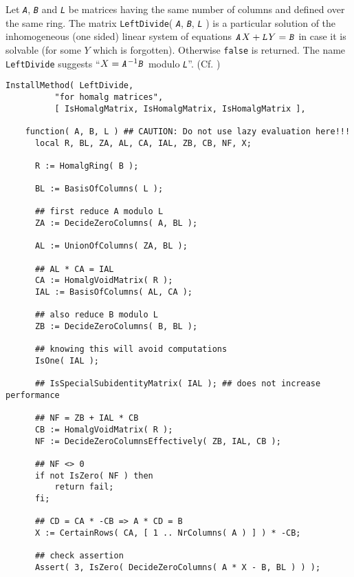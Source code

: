 \documentclass[a4paper,11pt]{report}
\begin{document}
{{{ Let \mbox{\texttt{\slshape A}}, \mbox{\texttt{\slshape B}} and \mbox{\texttt{\slshape L}} be matrices having the same number of columns and defined over the same ring.
The matrix \texttt{LeftDivide}( \mbox{\texttt{\slshape A}}, \mbox{\texttt{\slshape B}}, \mbox{\texttt{\slshape L}} ) is a particular solution of the inhomogeneous (one sided) linear system of
equations $\mbox{\texttt{\slshape A}}X+\mbox{\texttt{\slshape L}}Y=\mbox{\texttt{\slshape B}}$ in case it is solvable (for some $Y$ which is forgotten). Otherwise \texttt{false} is returned. The name \texttt{LeftDivide} suggests ``$X=\mbox{\texttt{\slshape A}}^{-1}\mbox{\texttt{\slshape B}}$ modulo \mbox{\texttt{\slshape L}}''. (Cf. \cite[Subsection 3.1.1]{BR}) 
\begin{Verbatim}[fontsize=\small,frame=single,label=Code]
  InstallMethod( LeftDivide,
          "for homalg matrices",
          [ IsHomalgMatrix, IsHomalgMatrix, IsHomalgMatrix ],
          
    function( A, B, L )	## CAUTION: Do not use lazy evaluation here!!!
      local R, BL, ZA, AL, CA, IAL, ZB, CB, NF, X;
      
      R := HomalgRing( B );
      
      BL := BasisOfColumns( L );
      
      ## first reduce A modulo L
      ZA := DecideZeroColumns( A, BL );
      
      AL := UnionOfColumns( ZA, BL );
      
      ## AL * CA = IAL
      CA := HomalgVoidMatrix( R );
      IAL := BasisOfColumns( AL, CA );
      
      ## also reduce B modulo L
      ZB := DecideZeroColumns( B, BL );
      
      ## knowing this will avoid computations
      IsOne( IAL );
      
      ## IsSpecialSubidentityMatrix( IAL );	## does not increase performance
      
      ## NF = ZB + IAL * CB
      CB := HomalgVoidMatrix( R );
      NF := DecideZeroColumnsEffectively( ZB, IAL, CB );
      
      ## NF <> 0
      if not IsZero( NF ) then
          return fail;
      fi;
      
      ## CD = CA * -CB => A * CD = B
      X := CertainRows( CA, [ 1 .. NrColumns( A ) ] ) * -CB;
      
      ## check assertion
      Assert( 3, IsZero( DecideZeroColumns( A * X - B, BL ) ) );
      

\end{Verbatim}}}}
\end{document}
